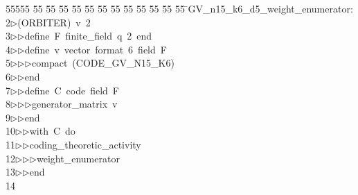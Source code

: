 %
%
\begin{tabbing}
55555 \= 55 \= 55 \= 55 \= 55 \= 55 \= 55 \= 55 \= 55 \= 55 \= 55 \= 55 \= 55 \= \>GV\_n15\_k6\_d5\_weight\_enumerator:\\[0pt]
2\>$\triangleright$\>(ORBITER)\ v\ 2\ \\[0pt]
3\>$\triangleright$\>$\triangleright$\>define\ F\ finite\_field\ q\ 2\ end\ \\[0pt]
4\>$\triangleright$\>$\triangleright$\>define\ v\ vector\ format\ 6\ field\ F\ \\[0pt]
5\>$\triangleright$\>$\triangleright$\>$\triangleright$\>compact\ (CODE\_GV\_N15\_K6)\ \\[0pt]
6\>$\triangleright$\>$\triangleright$\>end\ \\[0pt]
7\>$\triangleright$\>$\triangleright$\>define\ C\ code\ field\ F\ \\[0pt]
8\>$\triangleright$\>$\triangleright$\>$\triangleright$\>generator\_matrix\ v\ \\[0pt]
9\>$\triangleright$\>$\triangleright$\>end\ \\[0pt]
10\>$\triangleright$\>$\triangleright$\>with\ C\ do\ \\[0pt]
11\>$\triangleright$\>$\triangleright$\>coding\_theoretic\_activity\ \\[0pt]
12\>$\triangleright$\>$\triangleright$\>$\triangleright$\>weight\_enumerator\ \\[0pt]
13\>$\triangleright$\>$\triangleright$\>end\\[0pt]
14\>\end{tabbing}
